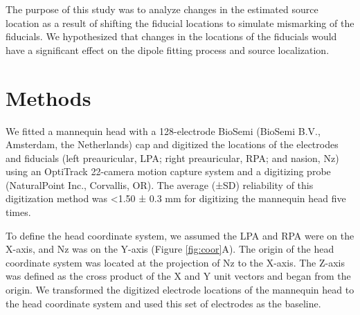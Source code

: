 \documentclass[../thesis_seyed.tex]{subfiles}
\begin{document}
The purpose of this study was to analyze changes in the estimated source location as a result of shifting the fiducial locations to simulate mismarking of the fiducials. We hypothesized that changes in the locations of the fiducials would have a significant effect on the dipole fitting process and source localization.

\section{Methods}

We fitted a mannequin head with a 128-electrode BioSemi (BioSemi B.V., Amsterdam, the Netherlands) cap and digitized the locations of the electrodes and fiducials (left preauricular, LPA; right preauricular, RPA; and nasion, Nz) using an OptiTrack 22-camera motion capture system and a digitizing probe (NaturalPoint Inc., Corvallis, OR). The average (±SD) reliability of this digitization method was <1.50 ± 0.3 mm for digitizing the mannequin head five times.

To define the head coordinate system, we assumed the LPA and RPA were on the X-axis, and Nz was on the Y-axis (Figure \ref{fig:coor}A). The origin of the head coordinate system was located at the projection of Nz to the X-axis. The Z-axis was defined as the cross product of the X and Y unit vectors and began from the origin. We transformed the digitized electrode locations of the mannequin head to the head coordinate system and used this set of electrodes as the baseline.
\end{document}
